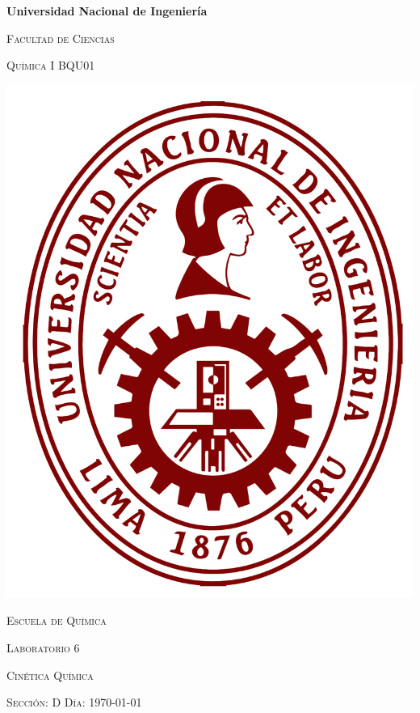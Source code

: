 \documentclass[../main]{subfiles}
\begin{document}
\begin{titlepage}
  \vspace*{\fill}
  \centering
  {\bfseries\LARGE Universidad Nacional de Ingeniería \par}
  \vspace{12pt}
  {\scshape\large Facultad de Ciencias \par}
  \vspace{0.5cm}
  {\scshape\huge Química I BQU01 \par}
  \vspace{0.5cm}
  \includegraphics[height=0.3\textheight]{resources/uni_logo.png}\par
  \vspace{0.5cm}  
  {\scshape\large Escuela de Química \par}
  \vspace{1cm}
  {\scshape\huge Laboratorio 6}\par
  \vspace{0.5cm}
  {\scshape\large Cinética Química \par}
  {\scshape\normalsize Sección: D \hspace{12pt} Día: \today \par}

\end{titlepage}
\end{document}
